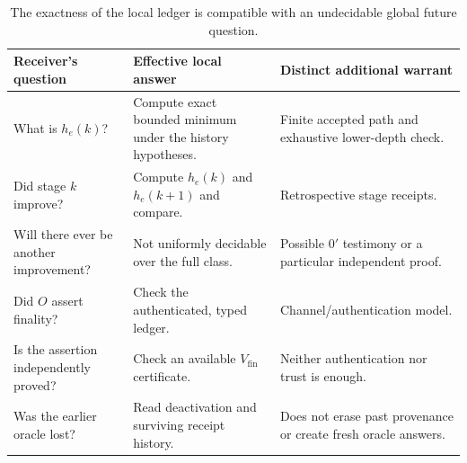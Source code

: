 \documentclass[11pt,letterpaper]{article}
\theoremstyle{definition}
\theoremstyle{remark}
\begin{document}
\begin{table}[htbp]
\centering\small
\begin{tabularx}{\linewidth}{@{}p{.27\linewidth}X X@{}}
\toprule
\textbf{Receiver's question}&\textbf{Effective local answer}&\textbf{Distinct additional warrant}\\\midrule
What is $h_e(k)$?&Compute exact bounded minimum under the history hypotheses.&Finite accepted path and exhaustive lower-depth check.\\
Did stage $k$ improve?&Compute $h_e(k)$ and $h_e(k+1)$ and compare.&Retrospective stage receipts.\\
Will there ever be another improvement?&Not uniformly decidable over the full class.&Possible $0'$ testimony or a particular independent proof.\\
Did $O$ assert finality?&Check the authenticated, typed ledger.&Channel/authentication model.\\
Is the assertion independently proved?&Check an available $V_{\mathrm{fin}}$ certificate.&Neither authentication nor trust is enough.\\
Was the earlier oracle lost?&Read deactivation and surviving receipt history.&Does not erase past provenance or create fresh oracle answers.\\\bottomrule
\end{tabularx}
\caption{The exactness of the local ledger is compatible with an undecidable global future question.}
\end{table}
\end{document}
